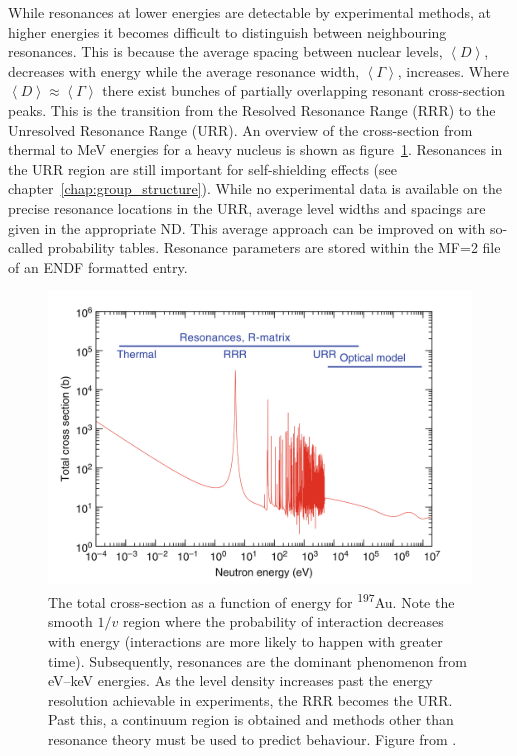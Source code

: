 While resonances at lower energies are detectable by experimental methods, at higher energies it becomes difficult to distinguish between neighbouring resonances. This is because the average spacing between nuclear levels, $\left<D\right>$, decreases with energy while the average resonance width, $\left<\Gamma\right>$, increases. Where $\left<D\right> \approx \left<\Gamma\right>$ there exist bunches of partially overlapping resonant cross-section peaks. This is the transition from the Resolved Resonance Range (RRR) to the Unresolved Resonance Range (URR). An overview of the cross-section from thermal to MeV energies for a heavy nucleus is shown as figure~\ref{fig:au-197_sigma_tot}. Resonances in the URR region are still important for self-shielding effects (see chapter~\ref{chap:group_structure}). While no experimental data is available on the precise resonance locations in the URR, average level widths and spacings are given in the appropriate ND. This average approach can be improved on with so-called probability tables. Resonance parameters are stored within the MF=2 file of an ENDF formatted entry. 


\begin{figure}[ht]
  \includegraphics[width=\textwidth]{au-197_sigma_tot}
  \caption[Total cross-section for $^{197}$Au.]{The total cross-section as a function of energy for \textsuperscript{197}Au. Note the smooth $1/v$ region where the probability of interaction decreases with energy (interactions are more likely to happen with greater time). Subsequently, resonances are the dominant phenomenon from eV--keV energies. As the level density increases past the energy resolution achievable in experiments, the RRR becomes the URR. Past this, a continuum region is obtained and methods other than resonance theory must be used to predict behaviour. Figure from \cite{Cacuci2010}.}
  \label{fig:au-197_sigma_tot}
\end{figure}

